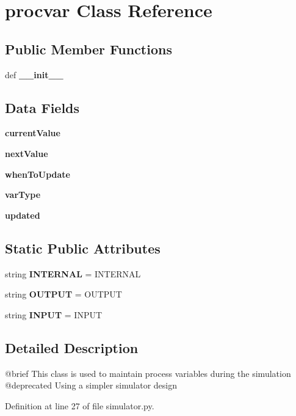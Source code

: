 \section{procvar Class Reference}
\label{classsimulator_1_1procvar}
\subsection*{Public Member Functions}
\begin{DoxyCompactItemize}
\item 
def {\bf \+\_\+\+\_\+init\+\_\+\+\_\+}
\end{DoxyCompactItemize}
\subsection*{Data Fields}
\begin{DoxyCompactItemize}
\item 
{\bf current\+Value}
\item 
{\bf next\+Value}
\item 
{\bf when\+To\+Update}
\item 
{\bf var\+Type}
\item 
{\bf updated}
\end{DoxyCompactItemize}
\subsection*{Static Public Attributes}
\begin{DoxyCompactItemize}
\item 
string {\bf I\+N\+T\+E\+R\+N\+A\+L} = \textquotesingle{}I\+N\+T\+E\+R\+N\+A\+L\textquotesingle{}
\item 
string {\bf O\+U\+T\+P\+U\+T} = \textquotesingle{}O\+U\+T\+P\+U\+T\textquotesingle{}
\item 
string {\bf I\+N\+P\+U\+T} = \textquotesingle{}I\+N\+P\+U\+T\textquotesingle{}
\end{DoxyCompactItemize}


\subsection{Detailed Description}
\begin{DoxyVerb}@brief This class is used to maintain process variables during the simulation
   @deprecated Using a simpler simulator design
\end{DoxyVerb}
 

Definition at line 27 of file simulator.\+py.



